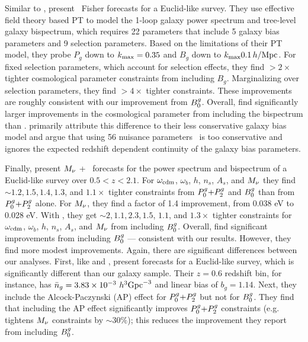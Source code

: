 Similar to \cite{yankelevich2019}, \cite{agarwal2020} present \lcdm~Fisher 
forecasts for a Euclid-like survey. 
They use effective field theory based PT to model the
1-loop galaxy power spectrum and tree-level galaxy bispectrum, which
requires 22 parameters that include 5 galaxy bias parameters and 9 selection 
parameters. Based on the limitations of their PT model, they probe 
$P_g$ down to $k_{\rm max} = 0.35$ and $B_g$ down to $k_{\rm max} 0.1\,h/\mathrm{Mpc}$. 
For fixed selection parameters, which account for selection effects, they find $>2\times$
tighter cosmological parameter constraints from including $B_g$. Marginalizing
over selection parameters, they find $>4\times$ tighter constraints. These 
improvements are roughly consistent with our improvement from $B^g_0$. 
Overall, \cite{agarwal2020} find significantly larger improvements in the
cosmological parameter from including the bispectrum than \cite{yankelevich2019}. 
\cite{agarwal2020} primarily attribute this difference to their less conservative
galaxy bias model and argue that using 56 nuisance parameters~\citep{yankelevich2019} 
is too conservative and ignores the expected redshift dependent continuity 
of the galaxy bias parameters. 

Finally, \cite{chudaykin2019} present $M_\nu$ + \lcdm~forecasts for the power
spectrum and bispectrum of a Euclid-like survey over $0.5 < z < 2.1$. For
$\omega_{\rm cdm}$, $\omega_b$, $h$, $n_s$, $A_s$, and $M_\nu$ they find
${\sim}1.2, 1.5, 1.4, 1.3$, and $1.1\times$ tighter constraints from $P^g_0{+}P^g_2$ and
$B^g_0$ than from $P^g_0{+}P^g_2$ alone. For $M_\nu$, they find a factor of 1.4 improvement, 
from 0.038 eV to 0.028 eV. With \planck, they get ${\sim}2, 1.1, 2.3, 1.5$,
$1.1$, and $1.3\times$ tighter constraints for $\omega_{\rm cdm}$, $\omega_b$,
$h$, $n_s$, $A_s$, and $M_\nu$ from including $B^g_0$. Overall, \cite{chudaykin2019} 
find significant improvements from including $B^g_0$ --- consistent with our
results. However, they find more modest improvements. 
Again, there are significant differences between our analyses. First, like
\cite{yankelevich2019} and \cite{agarwal2020}, \cite{chudaykin2019} present forecasts for a
Euclid-like survey, which is significantly different than our galaxy sample.
Their $z = 0.6$ redshift bin, for instance, has $\bar{n}_g = 3.83 \times 10^{-3}~h^3{\rm
Gpc}^{-3}$ and linear bias of $b_g = 1.14$. Next, they include the
Alcock-Paczynski (AP) effect for $P^g_0{+}P^g_2$ but not for $B^g_0$. They find that
including the AP effect significantly improves $P^g_0{+}P^g_2$ constraints (e.g.
tightens $M_\nu$ constraints by ${\sim}30\%$); this reduces the improvement
they report from including $B^g_0$. 

